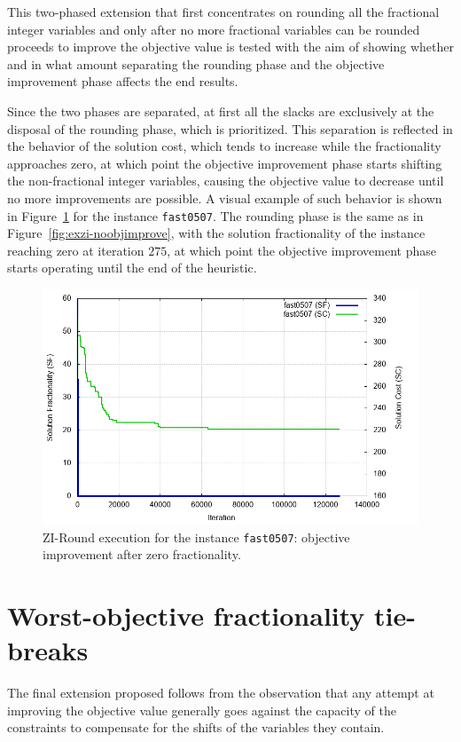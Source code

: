 \documentclass[a4paper,12pt,twoside]{scrbook}
\begin{document}
This two-phased extension that first concentrates on rounding all the fractional integer variables and only after no more fractional variables can be rounded proceeds to improve the objective value is tested with the aim of showing whether and in what amount separating the rounding phase and the objective improvement phase affects the end results. \par 

Since the two phases are separated, at first all the slacks are exclusively at the disposal of the rounding phase, which is prioritized. This separation is reflected in the behavior of the solution cost, which tends to increase while the fractionality approaches zero, at which point the objective improvement phase starts shifting the non-fractional integer variables, causing the objective value to decrease until no more improvements are possible. A visual example of such behavior is shown in Figure~\ref{fig:exzi-objimproveafter0frac} for the instance \texttt{fast0507}. The rounding phase is the same as in Figure~\ref{fig:exzi-noobjimprove}, with the solution fractionality of the instance reaching zero at iteration $275$, at which point the objective improvement phase starts operating until the end of the heuristic.
\begin{figure}[ht]
	\centering
	\includegraphics[width=\textwidth]{fast0507-shiftnfafter0frac.png}
	\caption{ZI-Round execution for the instance \texttt{fast0507}: objective improvement after zero fractionality.}
	\label{fig:exzi-objimproveafter0frac}
\end{figure}

\section{Worst-objective fractionality tie-breaks}
The final extension proposed follows from the observation that any attempt at improving the objective value generally goes against the capacity of the constraints to compensate for the shifts of the variables they contain. \par 
\end{document}
